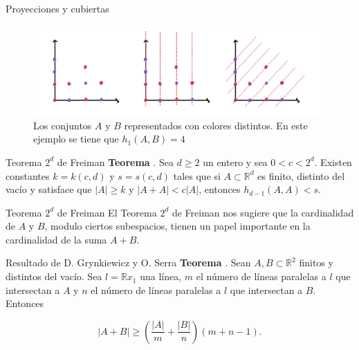 \documentclass{beamer}
\begin{document}
\begin{frame}{Proyecciones y cubiertas}
    \begin{figure}
        \centering
        \includegraphics[scale=0.17]{pics/proyeccion.jpeg}
        \caption{Los conjuntos $A$ y $B$ representados con colores distintos. En este ejemplo se tiene que $h_1(A,B) = 4$}
    \end{figure}
\end{frame}




\begin{frame}{Teorema $2^d$ de Freiman}
\textbf{Teorema} \cite{Freimanbook}.
    Sea $d \geq 2$ un entero y sea $0 < c < 2^d.$ Existen constantes $k = k(c,d)$ y $s = s(c,d)$ tales que si $A \subset \mathbb R^d$ es finito, distinto del vacío y satisface que $\lvert A \rvert \geq k$ y $\lvert A + A \rvert < c \lvert A \rvert $, entonces $h_{d-1}(A, A) < s.$

\end{frame}

\begin{frame}{Teorema $2^d$ de Freiman}
    El Teorema $2^d$ de Freiman nos sugiere que la cardinalidad de $A$ y $B$, modulo ciertos subespacios, tienen un papel importante en la cardinalidad de la suma $A + B.$
\end{frame}


\begin{frame}{Resultado de D. Grynkiewicz y O. Serra}
    \textbf{Teorema} \cite{GRYNKIEWICZ2010164}. Sean $A, B \subset \mathbb R^2$ finitos y distintos del vacío. Sea $l = \mathbb R x_1$ una línea, $m$ el número de líneas paralelas a $l$ que intersectan a $A$ y $n$ el número de líneas paralelas a $l$ que intersectan a $B$. Entonces

    $$\lvert A + B \rvert \geq \left( \frac{\lvert A \rvert}{m} + \frac{\lvert B \rvert}{n} \right) (m+n-1). $$

\end{frame}
\end{document}
